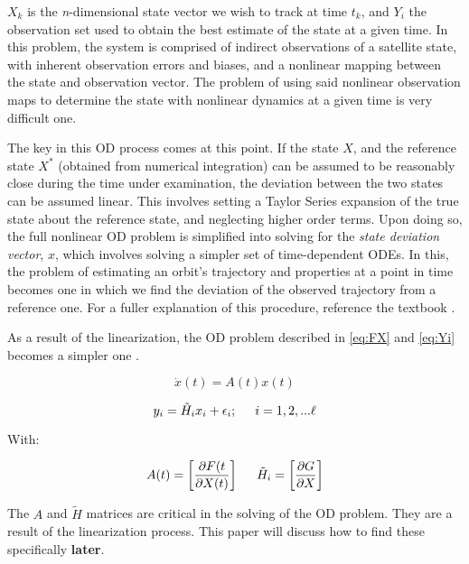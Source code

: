 \documentclass[12pt,a4paper,oneside]{article}
\numberwithin{equation}{section}   		%
\newcommand{\bad}[1]{\color{red}\textbf{#1}\color{black}}
\newcommand{\brackets} [1] {\left[ #1 \right]}
\begin{document}
$X_k$ is the \emph{n}-dimensional state vector we wish to track at time $t_k$, and  $Y_i$ the observation set used to obtain the best estimate of the state at a given time. In this problem, the system is comprised of indirect observations of a satellite state, with inherent observation errors and biases, and a nonlinear mapping between the state and observation vector. The problem of using said nonlinear observation maps to determine the state with nonlinear dynamics at a given time is very difficult one. 

The key in this OD process comes at this point. If the state $X$, and the reference state $X^*$ (obtained from numerical integration) can be assumed to be reasonably close during the time under examination, the deviation between the two states can be assumed linear. This involves setting a Taylor Series expansion of the true state about the reference state, and neglecting higher order terms. Upon doing so, the full nonlinear OD problem is simplified into solving for the \emph{state deviation vector}, $x$, which involves solving a simpler set of time-dependent ODEs. In this, the problem of estimating an orbit's trajectory and properties at a point in time becomes one in which we find the deviation of the observed trajectory from a reference one. For a fuller explanation of this procedure, reference the textbook \cite[section 4.2]{tapley2004statistical}.

As a result of the linearization, the OD problem described in \eqref{eq:FX} and \eqref{eq:Yi} becomes a simpler one . 

\begin{equation}
	\dot{x}(t) = A(t)x(t)
	\label{eq:x lin}
\end{equation}

\begin{equation}
	y_i = \tilde{H}_ix_i + \epsilon_i ;     \hspace{0.5cm}   i=1,2,...\ell
	\label{eq:y lin}
\end{equation}

With:

\begin{displaymath}
	A(t) = \brackets{\frac{\partial F(t}{\partial X(t)}}
	\hspace{0.5cm}
	\tilde{H}_i = \brackets{\frac{\partial G}{\partial X}}
\end{displaymath}

The $A$ and $\tilde{H}$ matrices are critical in the solving of the OD problem. They are a result of the linearization process. This paper will discuss how to find these specifically \bad{later}. 
\end{document}
